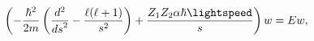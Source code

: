 \[\left(-\frac{\hbar^{2}}{2m}\left(\frac{{d}^{2}}{{ds}^{2}}-\frac{\ell(\ell+1)}{%
s^{2}}\right)+\frac{Z_{1}Z_{2}\alpha\hbar\lightspeed}{s}\right)w=Ew,\]